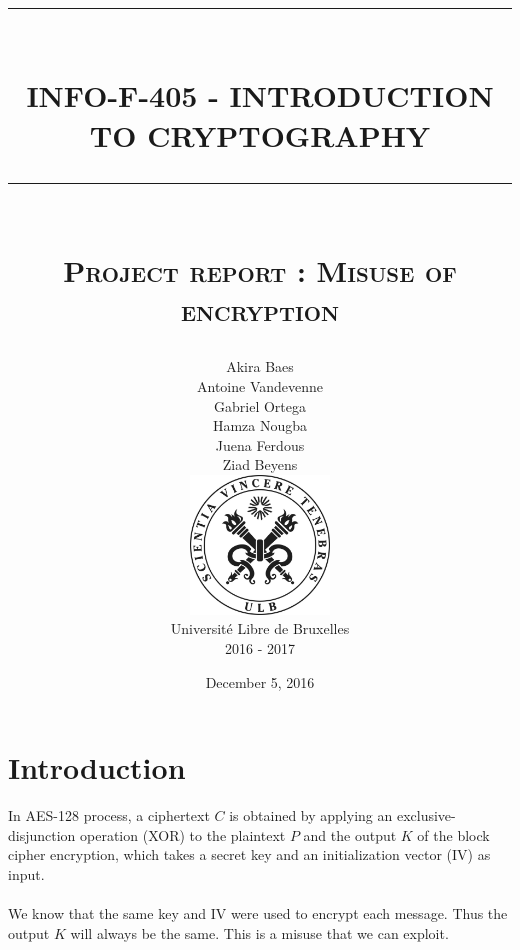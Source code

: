 \documentclass[a4paper,11pt]{article}
\newcommand{\HRule}[1]{\rule{\linewidth}{#1}}
\begin{document}

\title{ 
		\HRule{0.5pt} \\ [0.5cm]
		\LARGE \textbf{\uppercase{INFO-F-405 - Introduction to cryptography}}
		\HRule{0.5pt} \\ [0.5cm]
        \textsc{Project report : Misuse of encryption} \\
}

\author{
		Akira Baes \\ 
        Antoine Vandevenne \\ 
        Gabriel Ortega \\ 
        Hamza Nougba \\ 
		Juena Ferdous \\ 
		Ziad Beyens \\  [1cm]
        \includegraphics[width=120pt,height=105pt,keepaspectratio]{images/ULB_logo.png} \\ [0.5cm]
        \normalsize{Université Libre de Bruxelles} \\
        \normalsize{2016 - 2017} \\ [1cm]
}

\date{December 5, 2016}


\maketitle

\newpage
\tableofcontents

\newpage


\section{Introduction}

In AES-128 process, a ciphertext $C$ is obtained by applying an exclusive-disjunction operation (XOR) to the plaintext $P$ and the output $K$ of the block cipher encryption, which takes a secret key and an initialization vector (IV) as input.\\
\\
We know that the same key and IV were used to encrypt each message. Thus the output $K$ will always be the same. This is a misuse that we can exploit.
\end{document}
